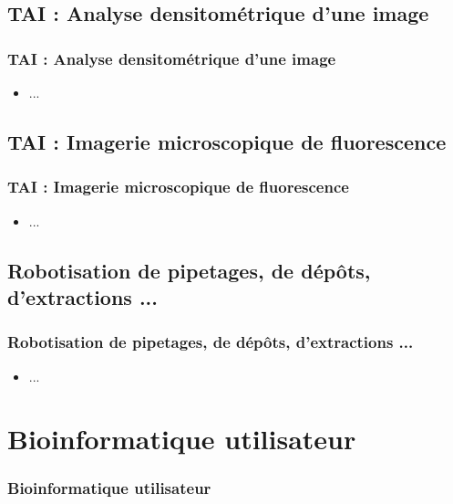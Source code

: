 \documentclass{beamer}
\begin{document}
\def\titleSection3Subsection2subsubsection3{ TAI : Analyse densitom{\'e}trique d'une image}
\subsection{ \titleSection3Subsection2subsubsection3 }
\begin{frame}
	\frametitle{ \titleSection3Subsection2subsubsection3 }
	\begin{itemize}
		\item ... 
	\end{itemize}
\end{frame}

\def\titleSection3Subsection2subsubsection4{ TAI : Imagerie microscopique de fluorescence}
\subsection{ \titleSection3Subsection2subsubsection4 }
\begin{frame}
	\frametitle{ \titleSection3Subsection2subsubsection4 }
	\begin{itemize}
		\item ... 
	\end{itemize}
\end{frame}



\def\titleSection3Subsection3{Robotisation de pipetages, de d{\'e}p{\^o}ts, d'extractions ...}
\subsection{ \titleSection3Subsection3 }
\begin{frame}
	\frametitle{ \titleSection3Subsection3 }
	\begin{itemize}
		\item ... 
	\end{itemize}
\end{frame}


\def\titleSection4{Bioinformatique utilisateur }
\section{ \titleSection4 }
\begin{frame}
	\frametitle{ \titleSection4 }
	\tableofcontents[sections=4,currentsection,subsectionstyle=show/shaded/hide]
\end{frame} 
\end{document}
